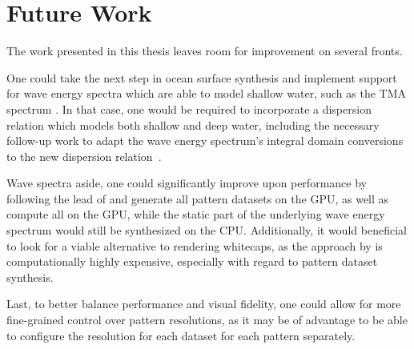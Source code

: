 \section{Future Work}
The work presented in this thesis leaves room for improvement on several fronts.

One could take the next step in ocean surface synthesis and implement support
for wave energy spectra which are able to model shallow water, such as the
TMA spectrum \citep{Hughes:1984}. In that case, one would be required to
incorporate a dispersion relation which models both shallow and deep water,
including the necessary follow-up work to adapt the wave energy spectrum's
integral domain conversions to the new dispersion relation~\citep{Horvath:2015}.

Wave spectra aside, one could significantly improve upon performance by
following the lead of \cite{misc:oceanlightingfft} and generate all
pattern datasets on the GPU, as well as compute all \InvDiscreteFourierTransforms
on the GPU, while the static part of the underlying wave energy spectrum
would still be synthesized on the CPU. Additionally, it would beneficial
to look for a viable alternative to rendering whitecaps, as the approach
by \citet{article:whitecaps} is computationally highly expensive,
especially with regard to pattern dataset synthesis.


Last, to better balance performance and visual fidelity, one could allow
for more fine-grained control over pattern resolutions, as it may be
of advantage to be able to configure the resolution for each dataset for
each pattern separately.
